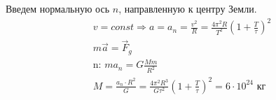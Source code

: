 \documentclass[a5paper,10pt]{article}
\begin{document}
Введем нормальную ось $n$, направленную к центру Земли.
\begin{gather*}
	v=const\Longrightarrow a=a_n=\frac{v^2}{R}=\frac{4\pi^2R}{T^2}(1+\frac{T}{\tau})^2\\
	m\vec{a}=\vec{F}_g\\
	\text{n: }ma_n=G\frac{Mm}{R^2}\\
	M=\frac{a_n\cdot{R^2}}{G}=\frac{4\pi^2R^3}{G\tau^2}(1+\frac{T}{\tau})^2=6\cdot10^{24}\text{ кг}\\
\end{gather*}
\end{document}
